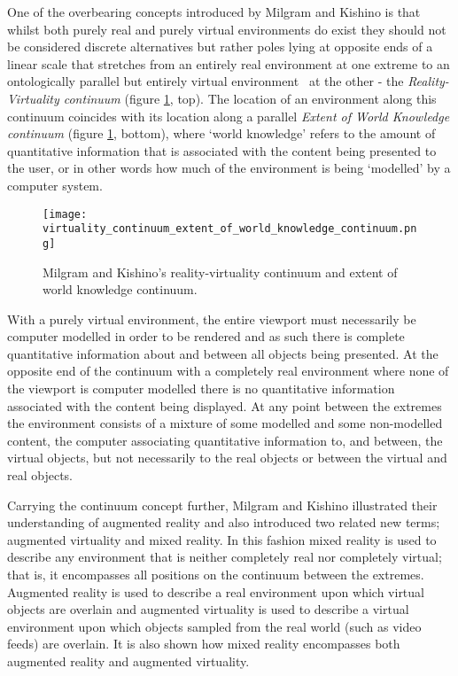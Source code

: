 
One of the overbearing concepts introduced by Milgram and Kishino is that whilst both purely real and purely virtual environments do exist they should not be considered discrete alternatives but rather poles lying at opposite ends of a linear scale that stretches from an entirely real environment at one extreme to an ontologically parallel but entirely virtual environment~\cite{Qvortrup2002} at the other - the \textit{Reality-Virtuality continuum} (figure \ref{reality_virtuality_extent_of_world_knowledge_continuum}, top). The location of an environment along this continuum coincides with its location along a parallel \textit{Extent of World Knowledge continuum} (figure \ref{reality_virtuality_extent_of_world_knowledge_continuum}, bottom), where `world knowledge' refers to the amount of quantitative information that is associated with the content being presented to the user, or in other words how much of the environment is being `modelled' by a computer system.

\begin{figure}[h]
\centering
\texttt{[image: virtuality\_continuum\_extent\_of\_world\_knowledge\_continuum.png]}
\caption{Milgram and Kishino's reality-virtuality continuum and extent of world knowledge continuum.}
\label{reality_virtuality_extent_of_world_knowledge_continuum}
\end{figure}

With a purely virtual environment, the entire viewport must necessarily be computer modelled in order to be rendered and as such there is complete quantitative information about and between all objects being presented. At the opposite end of the continuum with a completely real environment where none of the viewport is computer modelled there is no quantitative information associated with the content being displayed. At any point between the extremes the environment consists of a mixture of some modelled and some non-modelled content, the computer associating quantitative information to, and between, the virtual objects, but not necessarily to the real objects or between the virtual and real objects.

Carrying the continuum concept further, Milgram and Kishino illustrated their understanding of augmented reality and also introduced two related new terms; augmented virtuality and mixed reality. In this fashion mixed reality is used to describe any environment that is neither completely real nor completely virtual; that is, it encompasses all positions on the continuum between the extremes. Augmented reality is used to describe a real environment upon which virtual objects are overlain and augmented virtuality is used to describe a virtual environment upon which objects sampled from the real world (such as video feeds) are overlain. It is also shown how mixed reality encompasses both augmented reality and augmented virtuality.

